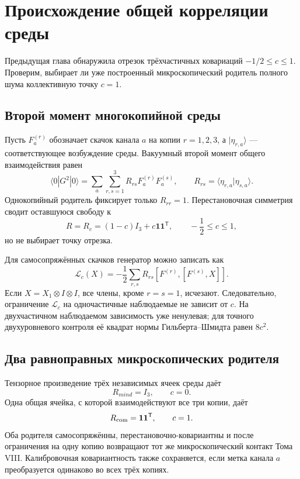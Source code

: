\chapter{Происхождение общей корреляции среды}
\label{ch:v8-baryon-common-environment-correlation-origin-gate}

Предыдущая глава обнаружила отрезок трёхчастичных ковариаций
$-1/2\leq c\leq1$. Проверим, выбирает ли уже построенный микроскопический
родитель полного шума коллективную точку $c=1$.

\section{Второй момент многокопийной среды}

Пусть $F_a^{(r)}$ обозначает скачок канала $a$ на копии $r=1,2,3$, а
$|\eta_{r,a}\rangle$ --- соответствующее возбуждение среды. Вакуумный
второй момент общего взаимодействия равен
\begin{equation}
 \langle0|G^2|0\rangle
 =\sum_a\sum_{r,s=1}^{3}R_{rs}F_a^{(r)}F_a^{(s)},
 \qquad
 R_{rs}=\langle\eta_{r,a}|\eta_{s,a}\rangle.
 \label{eq:v8-baryon-environment-second-moment}
\end{equation}
Однокопийный родитель фиксирует только $R_{rr}=1$. Перестановочная
симметрия сводит оставшуюся свободу к
\begin{equation}
 R=R_c=(1-c)I_3+c\mathbf1\mathbf1^{\mathsf T},
 \qquad -\frac12\leq c\leq1,
 \label{eq:v8-baryon-environment-covariance-family}
\end{equation}
но не выбирает точку отрезка.

Для самосопряжённых скачков генератор можно записать как
\begin{equation}
 \mathcal L_c(X)=-\frac12\sum_{r,s}R_{rs}
 [F^{(r)},[F^{(s)},X]].
 \label{eq:v8-baryon-copy-double-commutator}
\end{equation}
Если $X=X_1\otimes I\otimes I$, все члены, кроме $r=s=1$, исчезают.
Следовательно, ограничение $\mathcal L_c$ на одночастичные наблюдаемые не
зависит от $c$. На двухчастичном наблюдаемом зависимость уже ненулевая;
для точного двухуровневого контроля её квадрат нормы Гильберта--Шмидта
равен $8c^2$.

\section{Два равноправных микроскопических родителя}

Тензорное произведение трёх независимых ячеек среды даёт
\begin{equation}
 R_{
m ind}=I_3,
 \qquad c=0.
 \label{eq:v8-baryon-independent-environment}
\end{equation}
Одна общая ячейка, с которой взаимодействуют все три копии, даёт
\begin{equation}
 R_{\rm com}=\mathbf1\mathbf1^{\mathsf T},
 \qquad c=1.
 \label{eq:v8-baryon-common-environment}
\end{equation}
Оба родителя самосопряжённы, перестановочно-ковариантны и после ограничения
на одну копию возвращают тот же микроскопический контакт Тома VIII.
Калибровочная ковариантность также сохраняется, если метка канала $a$
преобразуется одинаково во всех трёх копиях.

